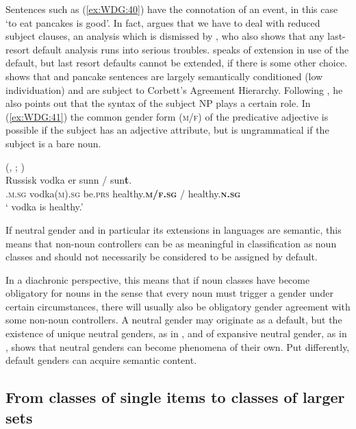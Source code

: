 \documentclass[output=collectionpaper]{langsci/langscibook}
\begin{document}
Sentences such as (\ref{ex:WDG:40}) have the connotation of an event, in this case `to eat pancakes is good'. In fact, \cite{Faarlund1977} argues that we have to deal with reduced subject clauses, an analysis which is dismissed by \cite{Enger2004}, who also shows that any last-resort default analysis runs into serious troubles. \cite[150]{Corbett2006} speaks of extension in use of the default, but last resort defaults cannot be extended, if there is some other choice. \cite{Enger2004} shows that  and  pancake sentences are largely semantically conditioned (low individuation) and are subject to Corbett's Agreement Hierarchy. Following \cite{Widmark1966}, he also points out that the syntax of the subject NP plays a certain role. In (\ref{ex:WDG:41}) the common gender form (\textsc{m/f}) of the predicative adjective is possible if the subject has an adjective attribute, but is ungrammatical if the subject is a bare noun.

\ea\label{ex:WDG:41}
 (, ; \citealt[24]{Enger2004})\\
\gll	Russisk	vodka	er	sunn	/	sun\textbf{t}.\\
	.\textsc{m.sg}	vodka(\textsc{m).sg}	be.\textsc{prs}	healthy.\textbf{\textsc{m/f.sg}}	/	healthy.\textbf{\textsc{n.sg}}\\
\glt	` vodka is healthy.'\\
\z

If neutral gender and in particular its extensions in  languages are semantic, this means that non-noun controllers can be as meaningful in classification as noun classes and should not necessarily be considered to be assigned by default.

In a diachronic perspective, this means that if noun classes have become obligatory for nouns in the sense that every noun must trigger a gender under certain circumstances, there will usually also be obligatory gender agreement with some non-noun controllers. A neutral gender may originate as a default, but the existence of unique neutral genders, as in , and of expansive neutral gender, as in , shows that neutral genders can become phenomena of their own. Put differently, default genders can acquire semantic content.

  \subsection{From classes of single items to classes of larger sets}
\label{sec:WDG:6.6}
\end{document}
